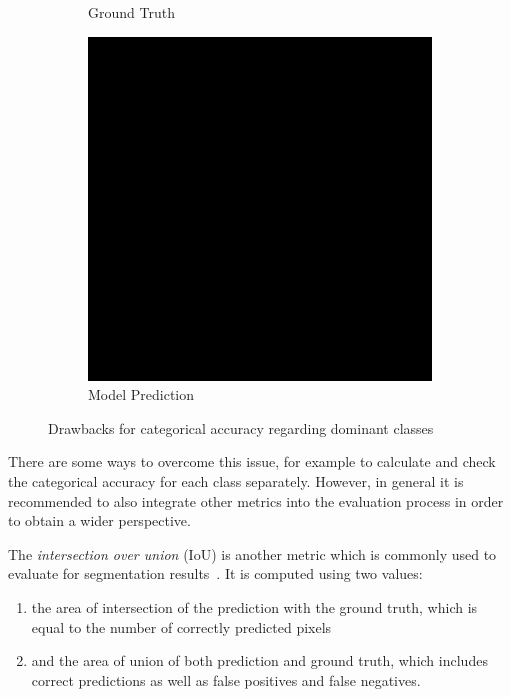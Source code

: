 \begin{figure}
\begin{subfigure}{\CategoricalAccuracyImageWidth}
        \caption{Ground Truth}
        \label{fig:ca_truth}
    \end{subfigure}
    \hfill
    \begin{subfigure}{\CategoricalAccuracyImageWidth}
        \includegraphics[width=\textwidth]{images/categorical_accuracy_prediction}
        \caption{Model Prediction}
        \label{fig:ca_prediction}
    \end{subfigure}
    \hfill
    \caption{Drawbacks for categorical accuracy regarding dominant classes~\cite{tds_segmentation18}}
    \label{fig:categorical_accuracy_drawbacks}
\end{figure}

There are some ways to overcome this issue, for example to calculate and check the categorical accuracy for each class separately. However, in general it is recommended to also integrate other metrics into the evaluation process in order to obtain a wider perspective.

The \emph{intersection over union} (IoU) is another metric which is commonly used to evaluate for segmentation results~\cite{pascal_voc15}. It is computed using two values:
\begin{enumerate}
    \item the area of intersection of the prediction with the ground truth, which is equal to the number of correctly predicted pixels
    \item and the area of union of both prediction and ground truth, which includes correct predictions as well as false positives and false negatives.
\end{enumerate}

